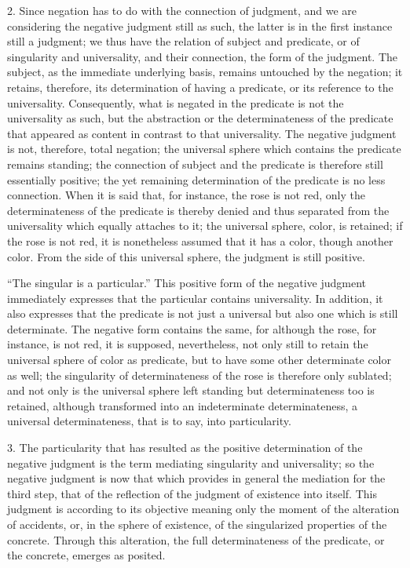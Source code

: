2. Since negation has to do with the connection of judgment,
and we are considering the negative judgment still as such,
the latter is in the first instance still a judgment;
we thus have the relation of subject and predicate,
or of singularity and universality,
and their connection, the form of the judgment.
The subject, as the immediate underlying basis,
remains untouched by the negation;
it retains, therefore,
its determination of having a predicate,
or its reference to the universality.
Consequently, what is negated in the predicate
is not the universality as such,
but the abstraction or the determinateness
of the predicate that appeared as
content in contrast to that universality.
The negative judgment is not, therefore, total negation;
the universal sphere which contains the predicate remains standing;
the connection of subject and the predicate is
therefore still essentially positive;
the yet remaining determination of
the predicate is no less connection.
When it is said that, for instance,
the rose is not red,
only the determinateness of the predicate is thereby denied
and thus separated from the universality
which equally attaches to it;
the universal sphere, color, is retained;
if the rose is not red,
it is nonetheless assumed that it has a color,
though another color.
From the side of this universal sphere,
the judgment is still positive.

“The singular is a particular.”
This positive form of the negative judgment
immediately expresses that the particular contains universality.
In addition, it also expresses that
the predicate is not just a universal
but also one which is still determinate.
The negative form contains the same,
for although the rose, for instance, is not red,
it is supposed, nevertheless, not only
still to retain the universal sphere of color as predicate,
but to have some other determinate color as well;
the singularity of determinateness
of the rose is therefore only sublated;
and not only is the universal sphere left standing
but determinateness too is retained,
although transformed into an indeterminate determinateness,
a universal determinateness, that is to say, into particularity.

3. The particularity that has resulted as
the positive determination of the negative judgment is
the term mediating singularity and universality;
so the negative judgment is now that which
provides in general the mediation for the third step,
that of the reflection of the judgment of existence into itself.
This judgment is according to its objective meaning
only the moment of the alteration of accidents,
or, in the sphere of existence,
of the singularized properties of the concrete.
Through this alteration, the full determinateness of the predicate,
or the concrete, emerges as posited.

